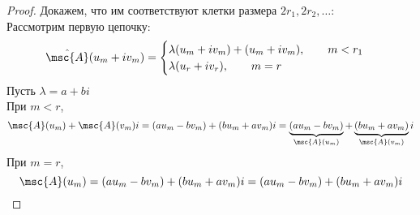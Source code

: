 \begin{proof}
	Докажем, что им соответствуют клетки размера $ 2r_1, 2r_2, \dots $: \\
	Рассмотрим первую цепочку:
	$$ \hat{\msc{A}}(u_m + iv_m) =
	\begin{cases}
		\lambda(u_m + iv_m) + (u_m + iv_m), \qquad m < r_1 \\
		\lambda(u_r + iv_r), \qquad m = r
	\end{cases} $$
	Пусть $ \lambda = a + bi $ \\
	При $ m < r $,
	$$ \msc{A}(u_m) + \msc{A}(v_m)i = (au_m - bv_m) + (bu_m + av_m)i = \underbrace{(au_m - bv_m)}_{\msc{A}(u_m)} + \underbrace{(bu_m + av_m)}_{\msc{A}(v_m)}i $$
	При $ m = r $,
	$$ \msc{A}(u_m) = (au_m - bv_m) + (bu_m + av_m)i = (au_m - bv_m) + (bu_m + av_m)i $$
\end{proof}
